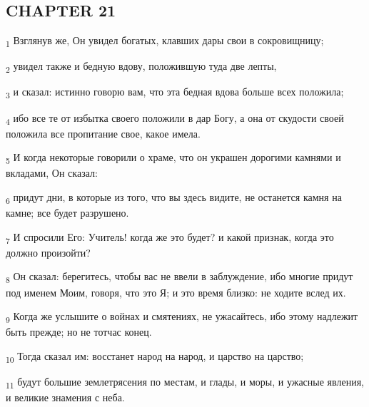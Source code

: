 \subsection{CHAPTER 21}
\begin{tcolorbox}
\textsubscript{1} Взглянув же, Он увидел богатых, клавших дары свои в сокровищницу;
\end{tcolorbox}
\begin{tcolorbox}
\textsubscript{2} увидел также и бедную вдову, положившую туда две лепты,
\end{tcolorbox}
\begin{tcolorbox}
\textsubscript{3} и сказал: истинно говорю вам, что эта бедная вдова больше всех положила;
\end{tcolorbox}
\begin{tcolorbox}
\textsubscript{4} ибо все те от избытка своего положили в дар Богу, а она от скудости своей положила все пропитание свое, какое имела.
\end{tcolorbox}
\begin{tcolorbox}
\textsubscript{5} И когда некоторые говорили о храме, что он украшен дорогими камнями и вкладами, Он сказал:
\end{tcolorbox}
\begin{tcolorbox}
\textsubscript{6} придут дни, в которые из того, что вы здесь видите, не останется камня на камне; все будет разрушено.
\end{tcolorbox}
\begin{tcolorbox}
\textsubscript{7} И спросили Его: Учитель! когда же это будет? и какой признак, когда это должно произойти?
\end{tcolorbox}
\begin{tcolorbox}
\textsubscript{8} Он сказал: берегитесь, чтобы вас не ввели в заблуждение, ибо многие придут под именем Моим, говоря, что это Я; и это время близко: не ходите вслед их.
\end{tcolorbox}
\begin{tcolorbox}
\textsubscript{9} Когда же услышите о войнах и смятениях, не ужасайтесь, ибо этому надлежит быть прежде; но не тотчас конец.
\end{tcolorbox}
\begin{tcolorbox}
\textsubscript{10} Тогда сказал им: восстанет народ на народ, и царство на царство;
\end{tcolorbox}
\begin{tcolorbox}
\textsubscript{11} будут большие землетрясения по местам, и глады, и моры, и ужасные явления, и великие знамения с неба.
\end{tcolorbox}
